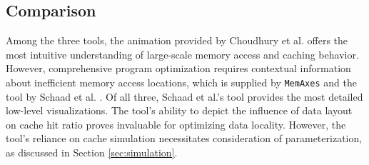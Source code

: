\subsection{Comparison}\label{sec:comparison}
Among the three tools, the animation provided by Choudhury et al. \cite{choudhury2011abstract} offers the most intuitive understanding of large-scale memory access and caching behavior. However, comprehensive program optimization requires contextual information about inefficient memory access locations, which is supplied by \texttt{MemAxes} \cite{gimenez2017memaxes} and the tool by Schaad et al. \cite{schaad2021boosting}. Of all three, Schaad et al.'s tool provides the most detailed low-level visualizations. The tool's ability to depict the influence of data layout on cache hit ratio proves invaluable for optimizing data locality. However, the tool's reliance on cache simulation necessitates consideration of parameterization, as discussed in Section \ref{sec:simulation}.